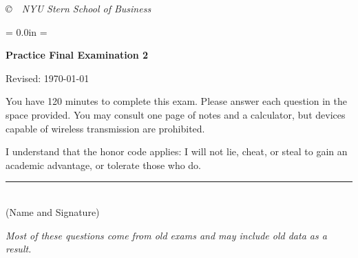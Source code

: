 \documentclass[letterpaper,12pt]{exam}
\def\HeadName{Practice Final Examination 1}
\begin{document}
\vfill \centerline{\it \copyright \ \number\year \
NYU Stern School of Business}



\newpage
\def\HeadName{Practice Final Examination 2}
\parindent = 0.0in
\parskip = \bigskipamount
\setcounter{page}{1} \thispagestyle{empty}
\Head

\centerline{\large \bf \HeadName}%
\centerline{Revised:  \today}

\bigskip
You have 120 minutes to complete this exam.  Please answer each
question in the space provided. You may consult one page of notes
and a calculator, but devices capable of wireless transmission are
prohibited.

I understand that the honor code applies: I will not lie, cheat,
or steal to gain an academic advantage, or tolerate those who do.

\begin{flushright}
\rule{4in}{0.5pt} \\ (Name and Signature)
\end{flushright}

{\it Most of these questions come from old exams and may include old data as a result. }
\end{document}
